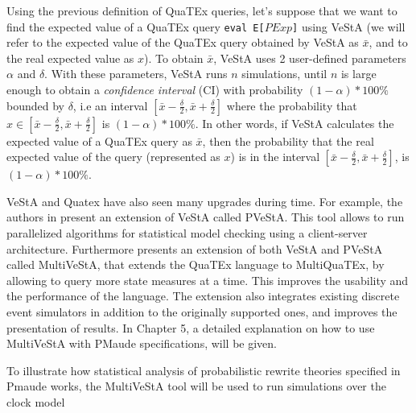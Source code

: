 Using the previous definition of QuaTEx queries, let's suppose that we want to find the expected value of a QuaTEx query \texttt{eval E[$PExp$]} using VeStA (we will refer to the expected value of the QuaTEx query obtained by VeStA as $\bar{x}$, and to the real expected value as $x$). To obtain $\bar{x}$, VeStA uses 2 user-defined parameters $\alpha$ and $\delta$. With these parameters, VeStA runs $n$ simulations, until $n$ is large enough to obtain a \textit{confidence interval} (CI) with probability $(1-\alpha) * 100\%$ bounded by $\delta$, i.e an interval $[\bar{x} - \frac{\delta}{2},\bar{x} + \frac{\delta}{2}]$ where the probability that $x \in [\bar{x} - \frac{\delta}{2},\bar{x} + \frac{\delta}{2}]$ is $(1-\alpha) * 100\%$. In other words, if VeStA calculates the expected value of a QuaTEx query as $\bar{x}$, then the probability that the real expected value of the query (represented as $x$) is in the interval $[\bar{x} - \frac{\delta}{2},\bar{x} + \frac{\delta}{2}]$, is $(1-\alpha) * 100\%$.

VeStA and Quatex have also seen many upgrades during time. For example, the authors in \cite{AlTurki2011} present an extension of VeStA called PVeStA. This tool allows to run parallelized algorithms for statistical model checking using a client-server architecture. Furthermore \cite{multivesta} presents an extension of both VeStA and PVeStA called MultiVeStA, that extends the QuaTEx language to MultiQuaTEx, by allowing to query more state measures at a time. This improves the usability and the performance of the language. The extension also integrates existing discrete event simulators in addition to the originally supported ones, and improves the presentation of results. In Chapter 5, a detailed explanation on how to use MultiVeStA with PMaude specifications, will be given.
 

To illustrate how statistical analysis of probabilistic rewrite theories specified in Pmaude works, the MultiVeStA tool will be used to run simulations over the clock model 

